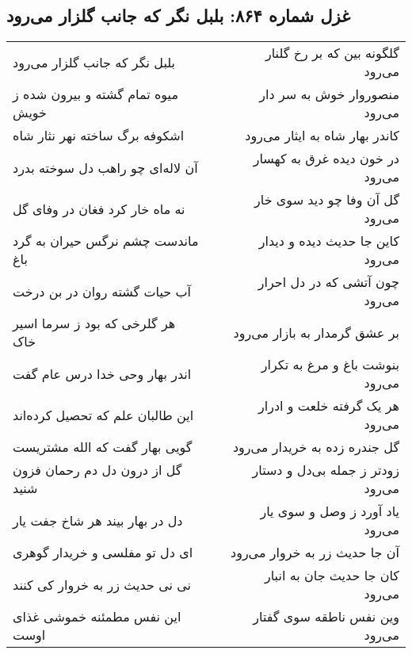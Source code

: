 \begin{center}
\section*{غزل شماره ۸۶۴: بلبل نگر که جانب گلزار می‌رود}
\label{sec:0864}
\begin{longtable}{l p{0.5cm} r}
بلبل نگر که جانب گلزار می‌رود
&&
گلگونه بین که بر رخ گلنار می‌رود
\\
میوه تمام گشته و بیرون شده ز خویش
&&
منصوروار خوش به سر دار می‌رود
\\
اشکوفه برگ ساخته نهر نثار شاه
&&
کاندر بهار شاه به ایثار می‌رود
\\
آن لاله‌ای چو راهب دل سوخته بدرد
&&
در خون دیده غرق به کهسار می‌رود
\\
نه ماه خار کرد فغان در وفای گل
&&
گل آن وفا چو دید سوی خار می‌رود
\\
ماندست چشم نرگس حیران به گرد باغ
&&
کاین جا حدیث دیده و دیدار می‌رود
\\
آب حیات گشته روان در بن درخت
&&
چون آتشی که در دل احرار می‌رود
\\
هر گلرخی که بود ز سرما اسیر خاک
&&
بر عشق گرمدار به بازار می‌رود
\\
اندر بهار وحی خدا درس عام گفت
&&
بنوشت باغ و مرغ به تکرار می‌رود
\\
این طالبان علم که تحصیل کرده‌اند
&&
هر یک گرفته خلعت و ادرار می‌رود
\\
گویی بهار گفت که الله مشتریست
&&
گل جندره زده به خریدار می‌رود
\\
گل از درون دل دم رحمان فزون شنید
&&
زودتر ز جمله بی‌دل و دستار می‌رود
\\
دل در بهار بیند هر شاخ جفت یار
&&
یاد آورد ز وصل و سوی یار می‌رود
\\
ای دل تو مفلسی و خریدار گوهری
&&
آن جا حدیث زر به خروار می‌رود
\\
نی نی حدیث زر به خروار کی کنند
&&
کان جا حدیث جان به انبار می‌رود
\\
این نفس مطمئنه خموشی غذای اوست
&&
وین نفس ناطقه سوی گفتار می‌رود
\\
\end{longtable}
\end{center}
